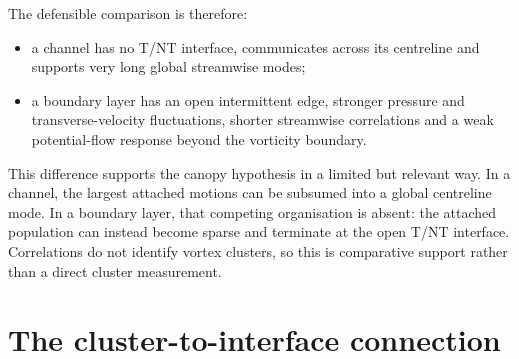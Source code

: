 \documentclass[11pt]{article}
\begin{document}
The defensible comparison is therefore:
\begin{itemize}
 \item a channel has no T/NT interface, communicates across its centreline and supports very long global streamwise modes;
 \item a boundary layer has an open intermittent edge, stronger pressure and transverse-velocity fluctuations, shorter streamwise correlations and a weak potential-flow response beyond the vorticity boundary.
\end{itemize}
This difference supports the canopy hypothesis in a limited but relevant way. In a channel, the largest attached motions can be subsumed into a global centreline mode. In a boundary layer, that competing organisation is absent: the attached population can instead become sparse and terminate at the open T/NT interface. Correlations do not identify vortex clusters, so this is comparative support rather than a direct cluster measurement.

\FloatBarrier
\section{The cluster-to-interface connection}
\label{sec:synthesis}
\end{document}
